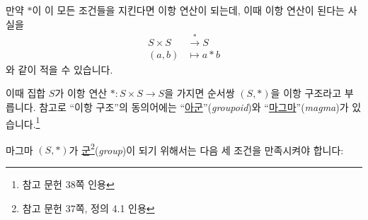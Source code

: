 \documentclass[12pt]{paper}
\begin{document}
  만약 $*$이 이 모든 조건들을 지킨다면 이항 연산이 되는데,
  이때 이항 연산이 된다는 사실을
  \begin{align*}
    S \times S & \xrightarrow{*} S \\
    \left( a , b \right) & \mapsto a * b
  \end{align*}
  와 같이 적을 수 있습니다.

  이때 집합 $S$가 이항 연산 $* : S \times S \to S$을 가지면 순서쌍 $\left( S , * \right)$을 이항 구조라고 부릅니다.
  참고로 ``이항 구조''의 동의어에는 ``\underline{아군}''(\textit{groupoid})와 ``\underline{마그마}''(\textit{magma})가 있습니다.\footnote{참고 문헌 \cite{fraleigh2009} 38쪽 인용}

  마그마 $ \left( S , * \right) $가 \underline{군}\footnote{참고 문헌 \cite{fraleigh2009} 37쪽, 정의 4.1 인용}(\textit{group})이 되기 위해서는 다음 세 조건을 만족시켜야 합니다:
\end{document}
